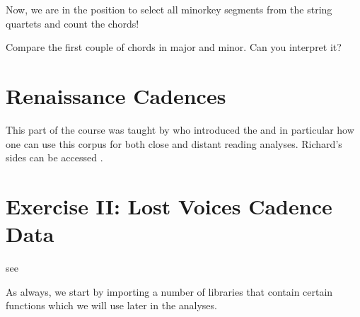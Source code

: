 \documentclass[letterpaper,10pt,english]{sphinxmanual}
\begin{document}
Now, we are in the position to select all minor\sphinxhyphen{}key segments from the string quartets and count the chords!

{
\begin{sphinxVerbatim}[commandchars=\\\{\}]
\llap{\color{nbsphinxin}[ ]:\,\hspace{\fboxrule}\hspace{\fboxsep}}
\end{sphinxVerbatim}
}

Compare the first couple of chords in major and minor. Can you interpret it?



\chapter{Renaissance Cadences}
\label{\detokenize{04_renaissance_cadences:renaissance-cadences}}\label{\detokenize{04_renaissance_cadences::doc}}
This part of the course was taught by 
who introduced the  and in particular how one can use this corpus for both close and distant reading analyses.
Richard’s sides can be accessed .


\chapter{Exercise II: Lost Voices Cadence Data}
\label{\detokenize{exercises/02_exercise:Exercise-II:-Lost-Voices-Cadence-Data}}\label{\detokenize{exercises/02_exercise::doc}}

see 

As always, we start by importing a number of libraries that contain certain functions which we will use later in the analyses.
\end{document}
